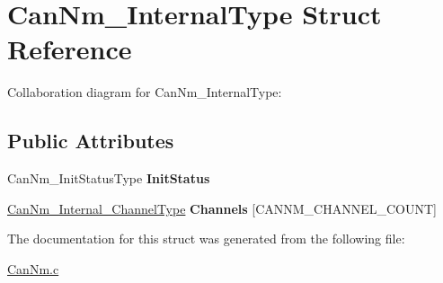 \hypertarget{structCanNm__InternalType}{}\section{Can\+Nm\+\_\+\+Internal\+Type Struct Reference}
\label{structCanNm__InternalType}


Collaboration diagram for Can\+Nm\+\_\+\+Internal\+Type\+:
\subsection*{Public Attributes}
\begin{DoxyCompactItemize}
\item 
Can\+Nm\+\_\+\+Init\+Status\+Type {\bfseries Init\+Status}\hypertarget{structCanNm__InternalType_aee270e87e09faa57027834a4ce133766}{}\label{structCanNm__InternalType_aee270e87e09faa57027834a4ce133766}

\item 
\hyperlink{structCanNm__Internal__ChannelType}{Can\+Nm\+\_\+\+Internal\+\_\+\+Channel\+Type} {\bfseries Channels} \mbox{[}C\+A\+N\+N\+M\+\_\+\+C\+H\+A\+N\+N\+E\+L\+\_\+\+C\+O\+U\+NT\mbox{]}\hypertarget{structCanNm__InternalType_ad2a2724fd24f37b3f1f69cecfd7876a9}{}\label{structCanNm__InternalType_ad2a2724fd24f37b3f1f69cecfd7876a9}

\end{DoxyCompactItemize}


The documentation for this struct was generated from the following file\+:\begin{DoxyCompactItemize}
\item 
\hyperlink{CanNm_8c}{Can\+Nm.\+c}\end{DoxyCompactItemize}
